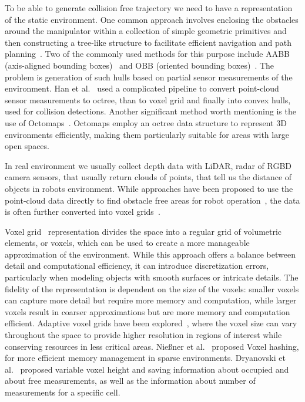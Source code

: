\documentclass[]{article}
\begin{document}
To be able to generate collision free trajectory we need to have a representation of the static environment. One common approach involves enclosing the obstacles around the manipulator within a collection of simple geometric primitives and then constructing a tree-like structure to facilitate efficient navigation and path planning~\cite{dai2022review}. Two of the commonly used methods for this purpose include AABB (axis-aligned bounding boxes)~\cite{vandenbergen1997efficient, chen2018path, luo2018collisionfree} and OBB (oriented bounding boxes)~\cite{gottschalk1996obbtree, puiu2011realtime}. The problem is generation of such hulls based on partial sensor measurements of the environment. Han et al.~\cite{han2018dynamic} used a complicated pipeline to convert point-cloud sensor measurements to octree, than to voxel grid and finally into convex hulls, used for collision detections. Another significant method worth mentioning is the use of Octomaps~\cite{wurmOctoMap}. Octomaps employ an octree data structure to represent 3D environments efficiently, making them particularly suitable for areas with large open spaces. 

In real environment we usually collect depth data with LiDAR, radar of RGBD camera sensors, that usually return clouds of points, that tell us the distance of objects in robots environment. While approaches have been proposed to use the point-cloud data directly to find obstacle free areas for robot operation~\cite{gao2019flying}, the data is often further converted into voxel grids~\cite{xu2021voxel, oleynikova2017voxblox, han2019fiesta}.

Voxel grid~\cite{xu2021voxel, elfes1989using} representation divides the space into a regular grid of volumetric elements, or voxels, which can be used to create a more manageable approximation of the environment. While this approach offers a balance between detail and computational efficiency, it can introduce discretization errors, particularly when modeling objects with smooth surfaces or intricate details. The fidelity of the representation is dependent on the size of the voxels: smaller voxels can capture more detail but require more memory and computation, while larger voxels result in coarser approximations but are more memory and computation efficient. Adaptive voxel grids have been explored~\cite{xu2021voxel}, where the voxel size can vary throughout the space to provide higher resolution in regions of interest while conserving resources in less critical areas. Nießner et al.~\cite{niessner2013realtime} proposed Voxel hashing, for more efficient memory management in sparse environments. Dryanovski et al.~\cite{dryanovski2010multivolume} proposed variable voxel height and saving information about occupied and about free measurements, as well as the information about number of measurements for a specific cell.
\end{document}
